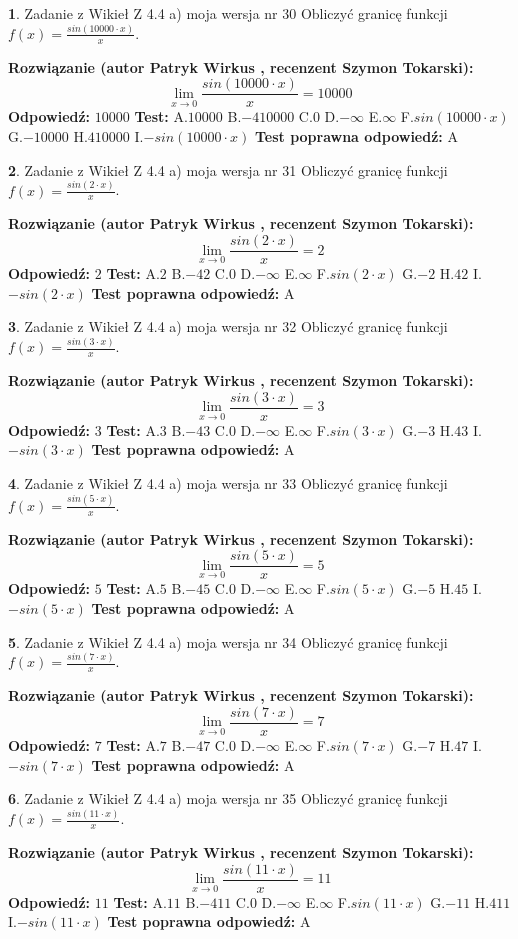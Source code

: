 \documentclass[12pt, a4paper]{article}
\theoremstyle{definition} %
\newtheorem{zad}{}
\newcommand{\zadStart}[1]{\begin{zad}#1\newline}
\newcommand{\zadStop}{\end{zad}}
\newcommand{\rozwStart}[2]{\noindent \textbf{Rozwiązanie (autor #1 , recenzent #2): }\newline}
\newcommand{\rozwStop}{\newline}
\newcommand{\odpStart}{\noindent \textbf{Odpowiedź:}\newline}
\newcommand{\odpStop}{\newline}
\newcommand{\testStart}{\noindent \textbf{Test:}\newline}
\newcommand{\testStop}{\newline}
\newcommand{\kluczStart}{\noindent \textbf{Test poprawna odpowiedź:}\newline}
\newcommand{\kluczStop}{\newline}
\begin{document}
\zadStart{Zadanie z Wikieł Z 4.4 a) moja wersja nr 30}
Obliczyć granicę funkcji $f(x)=\frac{sin(10000\cdot x)}{x}$.
\zadStop
\rozwStart{Patryk Wirkus}{Szymon Tokarski}
$$\lim\limits_{x\to 0}\frac{sin(10000\cdot x)}{x}=
10000$$
\rozwStop
\odpStart
$10000$
\odpStop
\testStart
A.$10000$
B.$-410000$
C.$0$
D.$-\infty$
E.$\infty$
F.$sin(10000\cdot x)$
G.$-10000$
H.$410000$
I.$-sin(10000\cdot x)$
\testStop
\kluczStart
A
\kluczStop



\zadStart{Zadanie z Wikieł Z 4.4 a) moja wersja nr 31}
Obliczyć granicę funkcji $f(x)=\frac{sin(2\cdot x)}{x}$.
\zadStop
\rozwStart{Patryk Wirkus}{Szymon Tokarski}
$$\lim\limits_{x\to 0}\frac{sin(2\cdot x)}{x}=
2$$
\rozwStop
\odpStart
$2$
\odpStop
\testStart
A.$2$
B.$-42$
C.$0$
D.$-\infty$
E.$\infty$
F.$sin(2\cdot x)$
G.$-2$
H.$42$
I.$-sin(2\cdot x)$
\testStop
\kluczStart
A
\kluczStop



\zadStart{Zadanie z Wikieł Z 4.4 a) moja wersja nr 32}
Obliczyć granicę funkcji $f(x)=\frac{sin(3\cdot x)}{x}$.
\zadStop
\rozwStart{Patryk Wirkus}{Szymon Tokarski}
$$\lim\limits_{x\to 0}\frac{sin(3\cdot x)}{x}=
3$$
\rozwStop
\odpStart
$3$
\odpStop
\testStart
A.$3$
B.$-43$
C.$0$
D.$-\infty$
E.$\infty$
F.$sin(3\cdot x)$
G.$-3$
H.$43$
I.$-sin(3\cdot x)$
\testStop
\kluczStart
A
\kluczStop



\zadStart{Zadanie z Wikieł Z 4.4 a) moja wersja nr 33}
Obliczyć granicę funkcji $f(x)=\frac{sin(5\cdot x)}{x}$.
\zadStop
\rozwStart{Patryk Wirkus}{Szymon Tokarski}
$$\lim\limits_{x\to 0}\frac{sin(5\cdot x)}{x}=
5$$
\rozwStop
\odpStart
$5$
\odpStop
\testStart
A.$5$
B.$-45$
C.$0$
D.$-\infty$
E.$\infty$
F.$sin(5\cdot x)$
G.$-5$
H.$45$
I.$-sin(5\cdot x)$
\testStop
\kluczStart
A
\kluczStop



\zadStart{Zadanie z Wikieł Z 4.4 a) moja wersja nr 34}
Obliczyć granicę funkcji $f(x)=\frac{sin(7\cdot x)}{x}$.
\zadStop
\rozwStart{Patryk Wirkus}{Szymon Tokarski}
$$\lim\limits_{x\to 0}\frac{sin(7\cdot x)}{x}=
7$$
\rozwStop
\odpStart
$7$
\odpStop
\testStart
A.$7$
B.$-47$
C.$0$
D.$-\infty$
E.$\infty$
F.$sin(7\cdot x)$
G.$-7$
H.$47$
I.$-sin(7\cdot x)$
\testStop
\kluczStart
A
\kluczStop



\zadStart{Zadanie z Wikieł Z 4.4 a) moja wersja nr 35}
Obliczyć granicę funkcji $f(x)=\frac{sin(11\cdot x)}{x}$.
\zadStop
\rozwStart{Patryk Wirkus}{Szymon Tokarski}
$$\lim\limits_{x\to 0}\frac{sin(11\cdot x)}{x}=
11$$
\rozwStop
\odpStart
$11$
\odpStop
\testStart
A.$11$
B.$-411$
C.$0$
D.$-\infty$
E.$\infty$
F.$sin(11\cdot x)$
G.$-11$
H.$411$
I.$-sin(11\cdot x)$
\testStop
\kluczStart
A
\kluczStop
\end{document}
